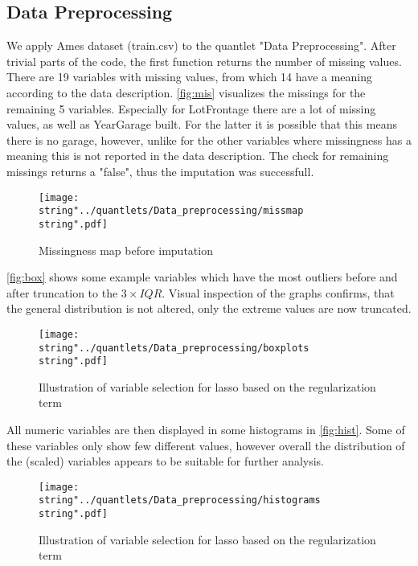 
\subsection{Data Preprocessing}
We apply Ames dataset (train.csv) to the quantlet "Data Preprocessing".
After trivial parts of the code, the first function returns the number of missing values.  There are 19 variables with missing values, from which 14 have a meaning according to the data description. 
\autoref{fig:mis} visualizes the missings for the remaining 5 variables. Especially for LotFrontage there are a lot of missing values, as well as YearGarage built. For the latter it is possible that this means there is no garage, however, unlike for the other variables where missingness has a meaning this is not reported in the data description. The check for remaining missings returns a "false", thus the imputation was successfull. 

\begin{figure}[H]
  \centering
\texttt{[image: \\string"../quantlets/Data\_preprocessing/missmap\\string".pdf]}
  \caption{Missingness map before imputation}\label{fig:mis}
\end{figure}
 
\autoref{fig:box} shows some example variables which have the most outliers before and after truncation to the $3 \times IQR$. Visual inspection of the graphs confirms, that the general distribution is not altered, only the extreme values are now truncated. 
\begin{figure}[H]
  \centering
\texttt{[image: \\string"../quantlets/Data\_preprocessing/boxplots\\string".pdf]}
  \caption{Illustration of variable selection for lasso based on the regularization term}\label{fig:box}
\end{figure}

All numeric variables are then displayed in some histograms in \autoref{fig:hist}. Some of these variables only show few different values, however overall the distribution of the (scaled) variables appears to be suitable for further analysis. 
 
\begin{figure}[H]
  \centering
\texttt{[image: \\string"../quantlets/Data\_preprocessing/histograms\\string".pdf]}
  \caption{Illustration of variable selection for lasso based on the regularization term}\label{fig:step}
\end{figure}

